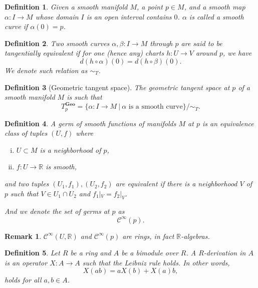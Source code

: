 \documentclass{article}
\newtheorem{definition}{Definition}[section]
\newtheorem{remark}{Remark}[section]
\numberwithin{equation}{section}
\begin{document}
\begin{definition}
Given a smooth manifold $M$, a point $p\in M$, and a smooth map $\alpha:I\to M$ whose domain $I$ is an open interval contains $0$. $\alpha$ is called a smooth curve if $\alpha(0)=p$.
\end{definition}

\begin{definition}
Two smooth curves $\alpha,\beta:I\to M$ through $p$ are said to be tangentially equivalent if for one (hence any) charts $h:U\to V$ around $p$, we have 
\begin{equation*}
d(h\circ\alpha)(0) = d(h\circ\beta)(0).
\end{equation*}
We denote such relation as $\sim_T$.
\end{definition}

\begin{definition}[Geometric tangent space]
The geometric tangent space at $p$ of a smooth manifold $M$ is such that
\begin{equation*}
T^{\mathbf{Geo}}_p=\{\alpha:I\to M\:|\: \alpha\text{ is a smooth curve}\}/\sim_T.
\end{equation*}
\end{definition}

\begin{definition}
A germ of smooth functions of manifolds $M$ at $p$ is an equivalence class of tuples $(U,f)$ where
\begin{enumerate}[i).]
\item $U\subset M$ is a neighborhood of $p$,
\item $f:U\to\mathbb{R}$ is smooth,
\end{enumerate}
and two tuples $(U_1,f_1),(U_2,f_2)$ are equivalent if there is a neighborhood $V$ of $p$ such that $V\in U_1\cap U_2$ and $f_1|_V=f_2|_V$. \\
\par And we denote the set of germs at $p$ as
\begin{equation*}
\mathcal{C}^\infty(p).
\end{equation*}
\end{definition}

\begin{remark}
$\mathcal{C}^\infty(U,\mathbb{R})$ and $\mathcal{C}^\infty(p)$ are rings, in fact $\mathbb{R}$-algebras. 
\end{remark}

\begin{definition}
Let $R$ be a ring and $A$ be a bimodule over $R$. A $R$-derivation in $A$ is an operator $X:A\to A$ such that the Leibniz rule holds. In other words, 
\begin{equation*}
X(ab) = aX(b)+X(a)b,
\end{equation*}
holds for all $a,b\in A$.
\end{definition}
\end{document}

